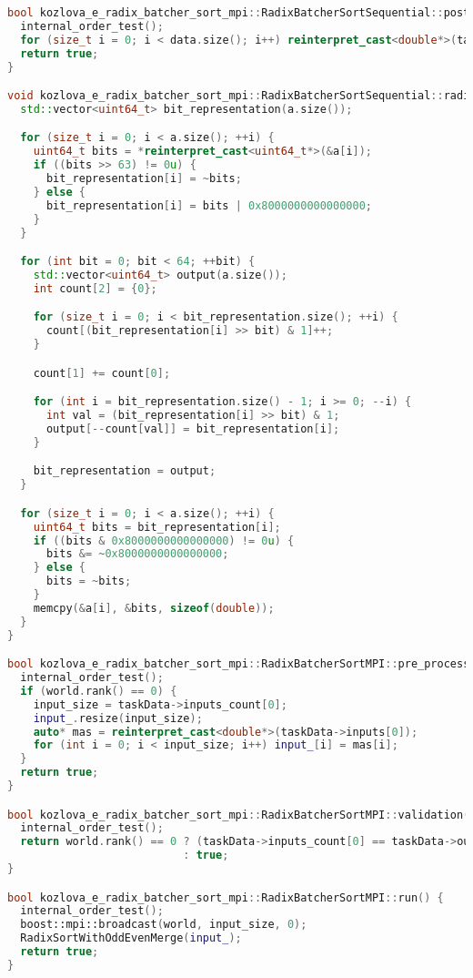 \documentclass[a4paper,12pt]{article}
\begin{document}
\begin{lstlisting}[language=C++,caption={Код программы}]
bool kozlova_e_radix_batcher_sort_mpi::RadixBatcherSortSequential::post_processing() {
  internal_order_test();
  for (size_t i = 0; i < data.size(); i++) reinterpret_cast<double*>(taskData->outputs[0])[i] = data[i];
  return true;
}

void kozlova_e_radix_batcher_sort_mpi::RadixBatcherSortSequential::radixSort(std::vector<double>& a) {
  std::vector<uint64_t> bit_representation(a.size());

  for (size_t i = 0; i < a.size(); ++i) {
    uint64_t bits = *reinterpret_cast<uint64_t*>(&a[i]);
    if ((bits >> 63) != 0u) {
      bit_representation[i] = ~bits;
    } else {
      bit_representation[i] = bits | 0x8000000000000000;
    }
  }

  for (int bit = 0; bit < 64; ++bit) {
    std::vector<uint64_t> output(a.size());
    int count[2] = {0};

    for (size_t i = 0; i < bit_representation.size(); ++i) {
      count[(bit_representation[i] >> bit) & 1]++;
    }

    count[1] += count[0];

    for (int i = bit_representation.size() - 1; i >= 0; --i) {
      int val = (bit_representation[i] >> bit) & 1;
      output[--count[val]] = bit_representation[i];
    }

    bit_representation = output;
  }

  for (size_t i = 0; i < a.size(); ++i) {
    uint64_t bits = bit_representation[i];
    if ((bits & 0x8000000000000000) != 0u) {
      bits &= ~0x8000000000000000;
    } else {
      bits = ~bits;
    }
    memcpy(&a[i], &bits, sizeof(double));
  }
}

bool kozlova_e_radix_batcher_sort_mpi::RadixBatcherSortMPI::pre_processing() {
  internal_order_test();
  if (world.rank() == 0) {
    input_size = taskData->inputs_count[0];
    input_.resize(input_size);
    auto* mas = reinterpret_cast<double*>(taskData->inputs[0]);
    for (int i = 0; i < input_size; i++) input_[i] = mas[i];
  }
  return true;
}

bool kozlova_e_radix_batcher_sort_mpi::RadixBatcherSortMPI::validation() {
  internal_order_test();
  return world.rank() == 0 ? (taskData->inputs_count[0] == taskData->outputs_count[0] && taskData->inputs_count[0] >= 0)
                           : true;
}

bool kozlova_e_radix_batcher_sort_mpi::RadixBatcherSortMPI::run() {
  internal_order_test();
  boost::mpi::broadcast(world, input_size, 0);
  RadixSortWithOddEvenMerge(input_);
  return true;
}


\end{lstlisting}
\end{document}
